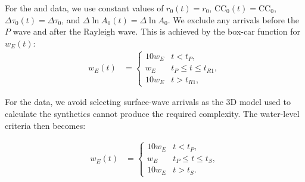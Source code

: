 
For the  and  data, we use constant values of $r_0(t)=r_0$, $\mathrm{CC}_0(t)=\mathrm{CC}_0$, $\Delta\tau_0(t)=\Delta\tau_0$, and $\Delta \ln A_0(t)=\Delta \ln A_0$. We exclude any arrivals before the $P$ wave and after the Rayleigh wave. This is achieved by the box-car function for $w_E(t)$:  
%
\begin{align}
w_E(t) & =
  \begin{cases}
    10 w_E & \text{$t < t_P$}, \\
    w_E & \text{$t_P \le t \leq t_{R1}$}, \\
    10 w_E & \text{$t > t_{R1}$},
  \end{cases}
\end{align}
%

For the  data, we avoid selecting surface-wave arrivals as the 3D model used to calculate the synthetics cannot produce the required complexity. The water-level criteria then becomes:

\begin{align}
w_E(t) & =
  \begin{cases}
    10 w_E & \text{$t < t_P$}, \\
    w_E & \text{$t_P \le t \leq t_S$}, \\
    10 w_E & \text{$t > t_S$}.
  \end{cases}
\end{align}


